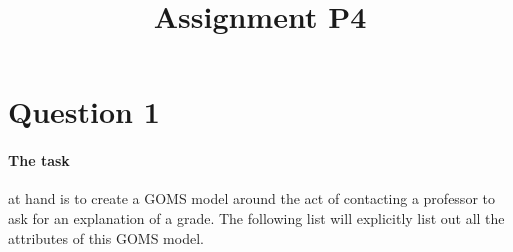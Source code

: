 

\title{Assignment P4\\}



\maketitle
\thispagestyle{fancy}

\section{Question 1}

\paragraph{The task} at hand is to create a GOMS model around the act of contacting a professor to ask for an explanation of a grade. The following list will explicitly list out all the attributes of this GOMS model.

